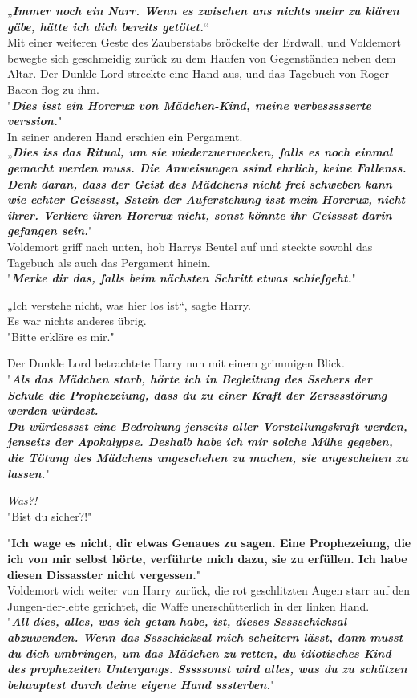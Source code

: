 {„\textbf{\emph{Immer noch ein Narr. Wenn es zwischen uns nichts mehr zu klären gäbe, hätte ich dich bereits getötet.}}“\\ Mit einer weiteren Geste des Zauberstabs bröckelte der Erdwall, und Voldemort bewegte sich geschmeidig zurück zu dem Haufen von Gegenständen neben dem Altar. Der Dunkle Lord streckte eine Hand aus, und das Tagebuch von Roger Bacon flog zu ihm.\\ "\textbf{\emph{Dies isst ein Horcrux von Mädchen-Kind, meine verbessssserte verssion.}}"\\ In seiner anderen Hand erschien ein Pergament.\\ „\textbf{\emph{Dies iss das Ritual, um sie wiederzuerwecken, falls es noch einmal gemacht werden muss. Die Anweisungen ssind ehrlich, keine Fallenss. Denk daran, dass der Geist des Mädchens nicht frei schweben kann wie echter Geisssst, Sstein der Auferstehung isst mein Horcrux, nicht ihrer. Verliere ihren Horcrux nicht, sonst könnte ihr Geisssst darin gefangen sein.}}"\\ Voldemort griff nach unten, hob Harrys Beutel auf und steckte sowohl das Tagebuch als auch das Pergament hinein.\\ "\textbf{\emph{Merke dir das, falls beim nächsten Schritt etwas schiefgeht.}}"

„Ich verstehe nicht, was hier los ist“, sagte Harry.\\ Es war nichts anderes übrig.\\ "Bitte erkläre es mir."

Der Dunkle Lord betrachtete Harry nun mit einem grimmigen Blick.\\ "\textbf{\emph{Als das Mädchen starb, hörte ich in Begleitung des Ssehers der Schule die Prophezeiung, dass du zu einer Kraft der Zersssstörung werden würdest.\\ Du würdesssst eine Bedrohung jenseits aller Vorstellungskraft werden, jenseits der Apokalypse. Deshalb habe ich mir solche Mühe gegeben, die Tötung des Mädchens ungeschehen zu machen, sie ungeschehen zu lassen.}}"

\emph{Was?!}\\ "Bist du sicher?!"

"\textbf{Ich wage es nicht, dir etwas Genaues zu sagen. Eine Prophezeiung, die ich von mir selbst hörte, verführte mich dazu, sie zu erfüllen. Ich habe diesen Dissasster nicht vergessen.}"\\ Voldemort wich weiter von Harry zurück, die rot geschlitzten Augen starr auf den Jungen-der-lebte gerichtet, die Waffe unerschütterlich in der linken Hand.\\ "\textbf{\emph{All dies, alles, was ich getan habe, ist, dieses Ssssschicksal abzuwenden. Wenn das Sssschicksal mich scheitern lässt, dann musst du dich umbringen, um das Mädchen zu retten, du idiotisches Kind des prophezeiten Untergangs. Sssssonst wird alles, was du zu schätzen behauptest durch deine eigene Hand sssterben.}}"

}
